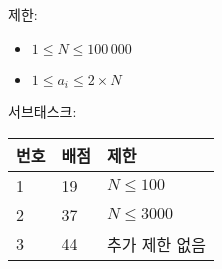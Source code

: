 제한:

\begin{itemize}
\item $1 \le N \le 100\,000$
\item $1 \le a_i \le 2\times N$
\end{itemize}

서브태스크:


\begin{tabular}{|l|l|l|} \hline
  \textbf{번호} & \textbf{배점} & \textbf{제한} \\ \hline
  1 & 19 & $N \le 100$ \\ \hline
  2 & 37 & $N \le 3000$ \\ \hline
  3 & 44 & 추가 제한 없음 \\ \hline
\end{tabular}